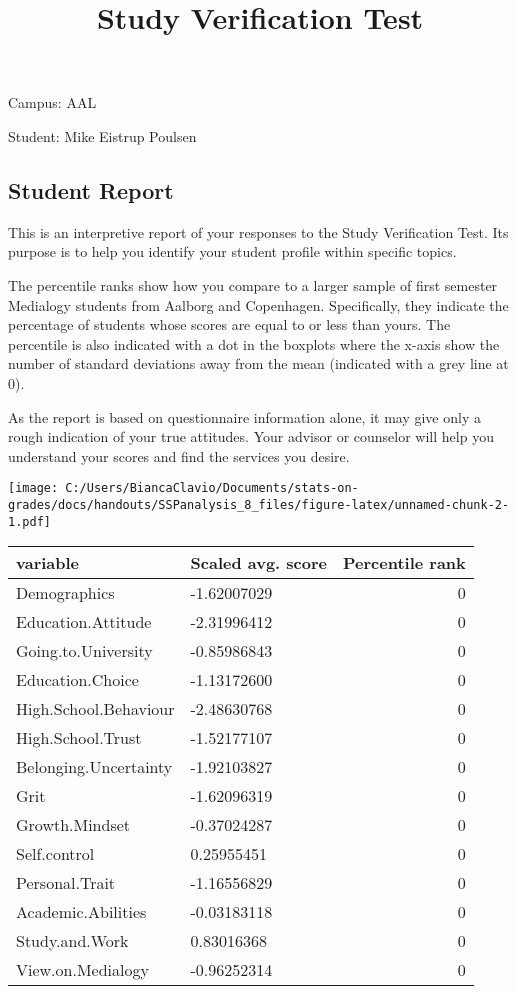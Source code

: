 \documentclass[]{article}
\title{Study Verification Test}
\author{}
\date{}
\begin{document}
\maketitle

Campus: AAL

Student: Mike Eistrup Poulsen

\subsection{Student Report}\label{student-report}

This is an interpretive report of your responses to the Study
Verification Test. Its purpose is to help you identify your student
profile within specific topics.

The percentile ranks show how you compare to a larger sample of first
semester Medialogy students from Aalborg and Copenhagen. Specifically,
they indicate the percentage of students whose scores are equal to or
less than yours. The percentile is also indicated with a dot in the
boxplots where the x-axis show the number of standard deviations away
from the mean (indicated with a grey line at 0).

As the report is based on questionnaire information alone, it may give
only a rough indication of your true attitudes. Your advisor or
counselor will help you understand your scores and find the services you
desire.

\texttt{[image: C:/Users/BiancaClavio/Documents/stats-on-grades/docs/handouts/SSPanalysis\_8\_files/figure-latex/unnamed-chunk-2-1.pdf]}

\begin{longtable}[]{@{}llr@{}}
\toprule
variable & Scaled avg. score & Percentile rank\tabularnewline
\midrule
\endhead
Demographics & -1.62007029 & 0\tabularnewline
Education.Attitude & -2.31996412 & 0\tabularnewline
Going.to.University & -0.85986843 & 0\tabularnewline
Education.Choice & -1.13172600 & 0\tabularnewline
High.School.Behaviour & -2.48630768 & 0\tabularnewline
High.School.Trust & -1.52177107 & 0\tabularnewline
Belonging.Uncertainty & -1.92103827 & 0\tabularnewline
Grit & -1.62096319 & 0\tabularnewline
Growth.Mindset & -0.37024287 & 0\tabularnewline
Self.control & 0.25955451 & 0\tabularnewline
Personal.Trait & -1.16556829 & 0\tabularnewline
Academic.Abilities & -0.03183118 & 0\tabularnewline
Study.and.Work & 0.83016368 & 0\tabularnewline
View.on.Medialogy & -0.96252314 & 0\tabularnewline
\bottomrule
\end{longtable}
\end{document}
